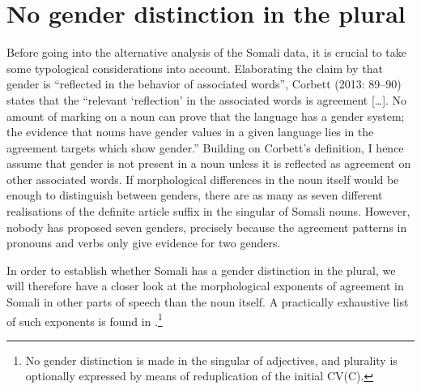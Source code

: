 \documentclass[output=paper]{langsci/langscibook}
\begin{document}
\section{No gender distinction in the plural}

Before going into the alternative analysis of the Somali data, it is crucial to take some typological considerations into account. Elaborating the claim by \citet[231]{Hockett1958} that gender is “reflected in the behavior of associated words”, Corbett (2013: 89{}--90) states that the “relevant ‘reflection’ in the associated words is agreement […]. No amount of marking on a noun can prove that the language has a gender system; the evidence that nouns have gender values in a given language lies in the agreement targets which show gender.” Building on Corbett’s definition, I hence assume that gender is not present in a noun unless it is reflected as agreement on other associated words. If morphological differences in the noun itself would be enough to distinguish between genders, there are as many as seven different realisations of the definite article suffix in the singular of Somali nouns. However, nobody has proposed seven genders, precisely because the agreement patterns in pronouns and verbs only give evidence for two genders. 

In order to establish whether Somali has a gender distinction in the plural, we will therefore have a closer look at the morphological exponents of agreement in Somali in other parts of speech than the noun itself. A practically exhaustive list of such exponents is found in .\footnote{No gender distinction is made in the singular of adjectives, and plurality is optionally expressed by means of reduplication of the initial CV(C).}
\end{document}
